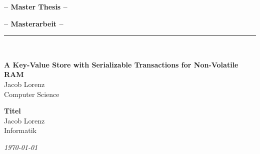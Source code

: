 %
\vspace{2.0cm}
%
\begin{center}
\begin{en}
    \Large{\textbf{--  Master Thesis --}}
\end{en}
\begin{de}
    \Large{\textbf{--  Masterarbeit --}}
\end{de}
    \rule{\textwidth}{0.6pt}\\[0.5cm]
\begin{en}
    \Large{\textbf{A Key-Value Store with Serializable Transactions for Non-Volatile RAM}}\\[3.0cm]
    \Large{Jacob Lorenz}\\
    \Large{Computer Science}\\
\end{en}
\begin{de}
    \Large{\textbf{Titel}}\\[3.0cm]
    \Large{Jacob Lorenz}\\
    \Large{Informatik}\\
\end{de}
\end{center}
%
\begin{center}
	 \large{\textit{\today}}
\end{center}
%
\vfill
\begin{center}
	\large
\begin{en}
        \\[0.2em]
        \\[0.2em]
        \\[0.2em]
\end{en}
\begin{de}
        \\[0.2em]
        \\[0.2em]
        \\[0.2em]
\end{de}
	\normalsize
\end{center}
%
